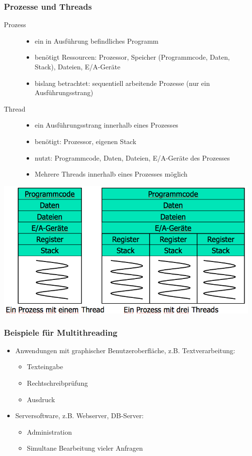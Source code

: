 \documentclass[11pt]{article}
\begin{document}
\subsubsection*{Prozesse und Threads}
\label{sec:orgfb6fa46}
\begin{description}
\item[{Prozess}] \begin{itemize}
\item ein in Ausführung befindliches Programm
\item benötigt Ressourcen: Prozessor, Speicher (Programmcode, Daten,
Stack), Dateien, E/A-Geräte
\item bislang betrachtet: sequentiell arbeitende Prozesse (nur ein Ausführungsstrang)
\end{itemize}
\item[{Thread}] \begin{itemize}
\item ein Ausführungsstrang innerhalb eines Prozesses
\item benötigt: Prozessor, eigenen Stack
\item nutzt: Programmcode, Daten, Dateien, E/A-Geräte des Prozesses
\item Mehrere Threads innerhalb eines Prozesses möglich
\end{itemize}
\end{description}

\begin{center}
\includegraphics[width=.9\linewidth]{./Abbildungen/prozessthreads.png}
\end{center}
\subsubsection*{Beispiele für Multithreading}
\label{sec:orgd419582}
\begin{itemize}
\item Anwendungen mit graphischer Benutzeroberfläche, z.B. Textverarbeitung:
\begin{itemize}
\item Texteingabe
\item Rechtschreibprüfung
\item Ausdruck
\end{itemize}
\item Serversoftware, z.B. Webserver, DB-Server:
\begin{itemize}
\item Administration
\item Simultane Bearbeitung vieler Anfragen
\end{itemize}
\end{itemize}
\end{document}
